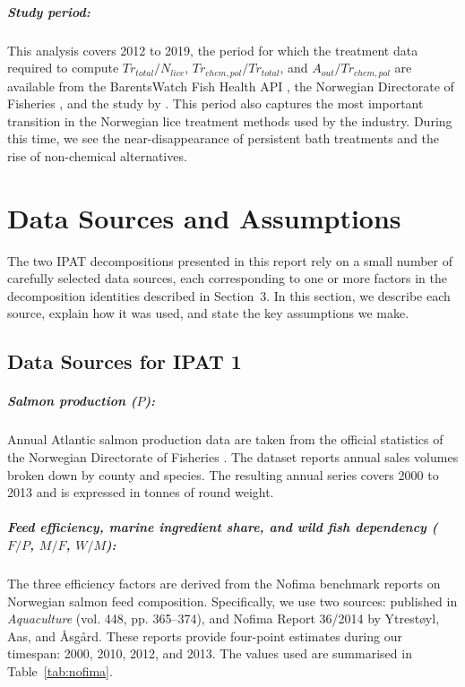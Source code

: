 \documentclass[12pt, a4paper]{report}
\begin{document}
\paragraph{Study period:}
This analysis covers 2012 to 2019, the period for which the treatment
data required to compute $Tr_{total}/N_{lice}$,
$Tr_{chem,pol}/Tr_{total}$, and $A_{out}/Tr_{chem,pol}$ are
available from the BarentsWatch Fish Health API \citep{barentswatch},
the Norwegian Directorate of Fisheries \citep{fiskeridir2024},
and the study by \citet{myhrjensen2020}. This period also captures the most important transition in the Norwegian lice treatment methods used by the industry. During this time, we see the near-disappearance of persistent bath treatments and the rise of non-chemical alternatives.












\chapter{Data Sources and Assumptions}

The two IPAT decompositions presented in this report rely on a small
number of carefully selected data sources, each corresponding to one or more factors in the decomposition identities described in Section~3.
In this section, we describe each source, explain how it was used, and state the key assumptions we make.

\section{Data Sources for IPAT 1}

\paragraph{Salmon production ($P$):}
Annual Atlantic salmon production data are taken from the official 
statistics of the Norwegian Directorate of Fisheries \citep{fiskeridir2024}. The dataset reports annual sales volumes broken down by county and species. The resulting annual series covers 2000 to 2013 and is expressed in tonnes of round weight.

\paragraph{Feed efficiency, marine ingredient share, and wild fish
dependency ($F/P$, $M/F$, $W/M$):}
The three efficiency factors are derived from the Nofima benchmark
reports on Norwegian salmon feed composition. Specifically, we use two
sources: \citet{ytrestoeyl2015} published in \textit{Aquaculture} (vol.
448, pp. 365--374), and Nofima Report 36/2014 by Ytrestøyl, Aas, and
Åsgård. These reports provide four-point estimates during our timespan: 
2000, 2010, 2012, and 2013. The values used are summarised in
Table~\ref{tab:nofima}.
\end{document}
